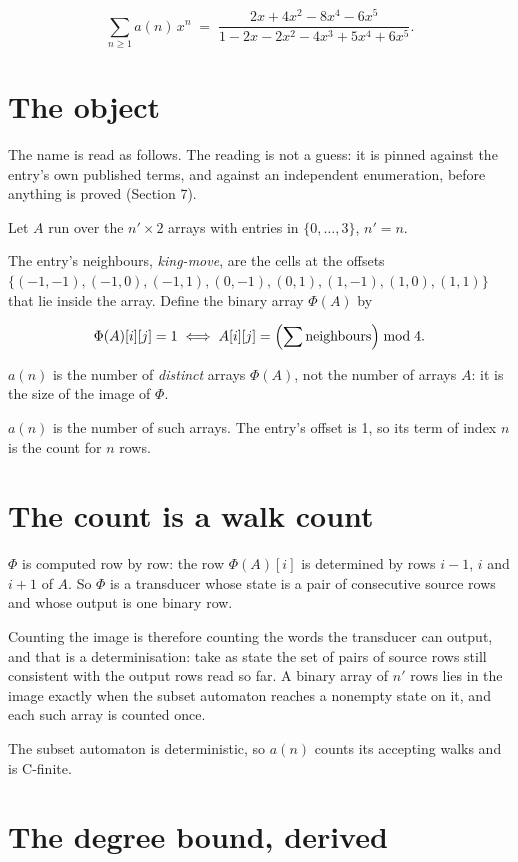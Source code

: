 \documentclass[11pt]{article}
\theoremstyle{definition}
\begin{document}
\[\sum_{n \ge 1} a(n)\,x^n \;=\; \frac{2x + 4x^{2} - 8x^{4} - 6x^{5}}{1 - 2x - 2x^{2} - 4x^{3} + 5x^{4} + 6x^{5}}.\]

\section{The object}

The name is read as follows. The reading is not a guess: it is pinned against the entry's own published terms, and against an independent enumeration, before anything is proved (Section 7).

Let $A$ run over the $n' \times 2$ arrays with entries in $\{0,\dots,3\}$, $n' = n$.

The entry's neighbours, {\itshape king-move}, are the cells at the offsets $\{(-1,-1), (-1,0), (-1,1), (0,-1), (0,1), (1,-1), (1,0), (1,1)\}$ that lie inside the array. Define the binary array $\Phi(A)$ by

\[\Phi(A)[i][j] = 1 \iff A[i][j] = \Bigl(\sum \text{neighbours}\Bigr) \bmod 4.\]

$a(n)$ is the number of {\itshape distinct} arrays $\Phi(A)$, not the number of arrays $A$: it is the size of the image of $\Phi$.

$a(n)$ is the number of such arrays. The entry's offset is 1, so its term of index $n$ is the count for $n$ rows.

\section{The count is a walk count}

$\Phi$ is computed row by row: the row $\Phi(A)[i]$ is determined by rows $i-1$, $i$ and $i+1$ of $A$. So $\Phi$ is a transducer whose state is a pair of consecutive source rows and whose output is one binary row.

Counting the image is therefore counting the words the transducer can output, and that is a determinisation: take as state the set of pairs of source rows still consistent with the output rows read so far. A binary array of $n'$ rows lies in the image exactly when the subset automaton reaches a nonempty state on it, and each such array is counted once.

The subset automaton is deterministic, so $a(n)$ counts its accepting walks and is C-finite.

\section{The degree bound, derived}
\end{document}
